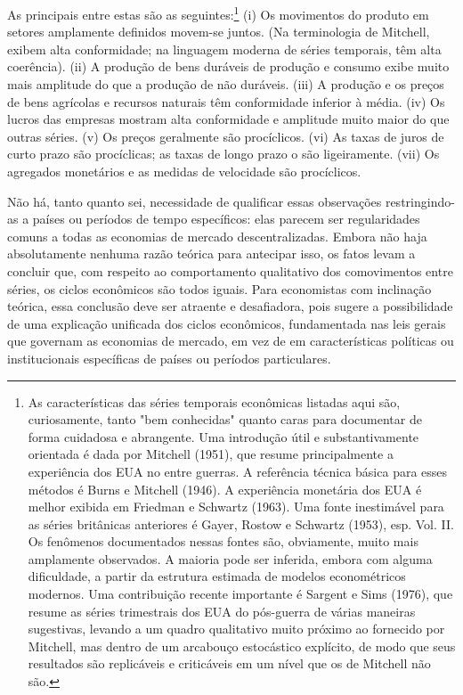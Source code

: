 \documentclass[12pt]{article}
\begin{document}
As principais entre estas são as seguintes:\footnote{As características das séries temporais econômicas listadas aqui são, curiosamente, tanto "bem conhecidas" quanto caras para documentar de forma cuidadosa e abrangente. Uma introdução útil e substantivamente orientada é dada por Mitchell (1951), que resume principalmente a experiência dos EUA no entre guerras. A referência técnica básica para esses métodos é Burns e Mitchell (1946). A experiência monetária dos EUA é melhor exibida em Friedman e Schwartz (1963). Uma fonte inestimável para as séries britânicas anteriores é Gayer, Rostow e Schwartz (1953), esp. Vol. II. Os fenômenos documentados nessas fontes são, obviamente, muito mais amplamente observados. A maioria pode ser inferida, embora com alguma dificuldade, a partir da estrutura estimada de modelos econométricos modernos. Uma contribuição recente importante é Sargent e Sims (1976), que resume as séries trimestrais dos EUA do pós-guerra de várias maneiras sugestivas, levando a um quadro qualitativo muito próximo ao fornecido por Mitchell, mas dentro de um arcabouço estocástico explícito, de modo que seus resultados são replicáveis e criticáveis em um nível que os de Mitchell não são.} (i) Os movimentos do produto em setores amplamente definidos movem-se juntos. (Na terminologia de Mitchell, exibem alta conformidade; na linguagem moderna de séries temporais, têm alta coerência). (ii) A produção de bens duráveis de produção e consumo exibe muito mais amplitude do que a produção de não duráveis. (iii) A produção e os preços de bens agrícolas e recursos naturais têm conformidade inferior à média. (iv) Os lucros das empresas mostram alta conformidade e amplitude muito maior do que outras séries. (v) Os preços geralmente são procíclicos. (vi) As taxas de juros de curto prazo são procíclicas; as taxas de longo prazo o são ligeiramente. (vii) Os agregados monetários e as medidas de velocidade são procíclicos.

Não há, tanto quanto sei, necessidade de qualificar essas observações restringindo-as a países ou períodos de tempo específicos: elas parecem ser regularidades comuns a todas as economias de mercado descentralizadas. Embora não haja absolutamente nenhuma razão teórica para antecipar isso, os fatos levam a concluir que, com respeito ao comportamento qualitativo dos comovimentos entre séries, os ciclos econômicos são todos iguais. Para economistas com inclinação teórica, essa conclusão deve ser atraente e desafiadora, pois sugere a possibilidade de uma explicação unificada dos ciclos econômicos, fundamentada nas leis gerais que governam as economias de mercado, em vez de em características políticas ou institucionais específicas de países ou períodos particulares.
\end{document}
